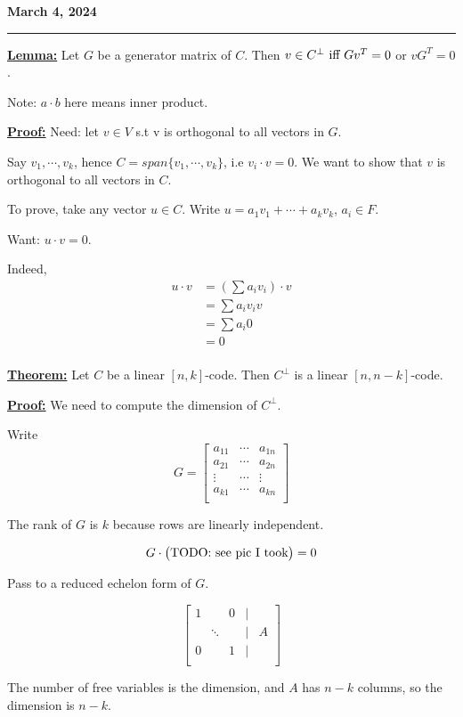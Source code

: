 \documentclass{article}
\newcommand{\header}[1]{
	\begin{Large}
	\noindent\textbf{#1}
	\vspace{2pt}
	\hrule
	\vspace{16pt}
	\end{Large}
	\normalsize
}
\renewcommand{\b}[1]{\textbf{#1}}
\newcommand{\ul}[1]{\underline{#1}}
\renewcommand{\aligned}[1]{
	\begin{align*}
		#1
	\end{align*}
}
\newcommand{\newdef}[2]{\b{\ul{#1:}} #2}
\renewcommand{\iff}{\textnormal{ iff }}
\begin{document}
\header{March 4, 2024}

\newdef{Lemma}{
	Let $G$ be a generator matrix of $C$. Then
	$v \in C^\perp \iff Gv^T = 0$ or $vG^T = 0$.

	Note: $a \cdot b$ here means inner product.
}

\newdef{Proof}{
	Need: let $v \in V$ s.t v is orthogonal to all vectors in $G$.

	Say $v_1, \cdots, v_k$, hence $C = span\{v_1, \cdots, v_k\}$,
	i.e $v_i \cdot v = 0$.
	We want to show that $v$ is orthogonal to all vectors in $C$.

	To prove, take any vector $u \in C$. Write
	$u = a_1v_1 + \cdots + a_kv_k$, $a_i \in F$.

	Want: $u \cdot v = 0$.

	Indeed, \aligned{
		u \cdot v & = (\sum a_iv_i) \cdot v \\
		          & = \sum a_i v_i v        \\
		          & = \sum a_i 0            \\
		          & = 0                     \\
	}
}

\newdef{Theorem}{
	Let $C$ be a linear $[n, k]$-code. Then $C^\perp$ is a linear
	$[n, n-k]$-code.
}

\newdef{Proof}{
	We need to compute the dimension of $C^\perp$.

	Write \[
		G = \begin{bmatrix}
			a_{11} & \cdots & a_{1n} \\
			a_{21} & \cdots & a_{2n} \\
			\vdots & \cdots & \vdots \\
			a_{k1} & \cdots & a_{kn} \\
		\end{bmatrix}
	\]

	The rank of $G$ is $k$ because rows are linearly independent.

	\[
		G \cdot \begin{pmatrix}
			\textnormal{TODO: see pic I took}
		\end{pmatrix} = 0
	\]

	Pass to a reduced echelon form of $G$.

	\[
		\begin{bmatrix}
			1 &        & 0 & | &   \\
			  & \ddots &   & | & A \\
			0 &        & 1 & | &   \\
		\end{bmatrix}
	\]

	The number of free variables is the dimension, and $A$ has $n-k$
	columns, so the dimension is $n-k$.
}
\end{document}

